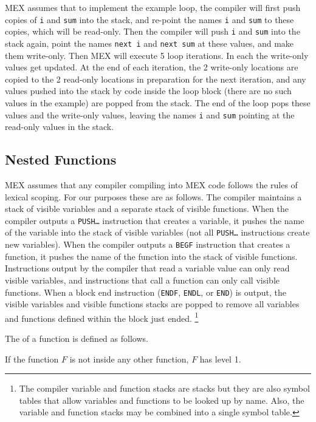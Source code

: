 \documentclass[12pt]{article}
\begin{document}
MEX assumes that to implement the example loop, the compiler
will first push copies of {\tt i} and {\tt sum} into
the stack, and re-point the names {\tt i} and {\tt sum} to these
copies, which will be read-only.
Then the compiler will push {\tt i} and {\tt sum}
into the stack again, point the names {\tt next i} and
{\tt next sum} at these values, and make them write-only.
Then MEX will execute 5 loop iterations.  In each the
write-only values get updated.  At the end of each
iteration, the 2 write-only locations are copied to the
2 read-only locations in preparation for the next
iteration, and any values pushed into the stack by
code inside the loop block (there are no such values
in the example) are popped from the stack.  The end of
the loop pops these values and the write-only values,
leaving the names {\tt i} and {\tt sum} pointing at the read-only values
in the stack.

\subsection{Nested Functions}
\label{NESTED-FUNCTIONS}

MEX assumes that any compiler compiling into MEX code follows the
rules of lexical scoping.  For our purposes these are as follows.
The compiler maintains a stack of visible variables and a separate
stack of visible functions.  When the compiler outputs a {\tt PUSH\ldots}
instruction that creates a variable, it pushes the name of the variable
into the stack of visible variables (not all {\tt PUSH\ldots} instructions
create new variables).  When the compiler outputs a {\tt BEGF}
instruction that creates a function, it pushes the name of the function
into the stack of visible functions.  Instructions output by the compiler
that read a variable value can only read visible variables, and 
instructions that call a function can only call visible functions.
When a block end instruction ({\tt ENDF}, {\tt ENDL}, or {\tt END}) is
output, the visible variables and visible functions stacks are popped to
remove all variables and functions defined within the block just ended.%
\footnote{The compiler variable and function stacks are stacks but they
are also symbol tables that allow variables and functions to be looked
up by name.  Also, the variable and function stacks may be combined into
a single symbol table.}

The \label{LEXICAL-LEVEL}
of a function is defined as follows.

If the function $F$ is not inside any other function, $F$ has
level 1.
\end{document}
